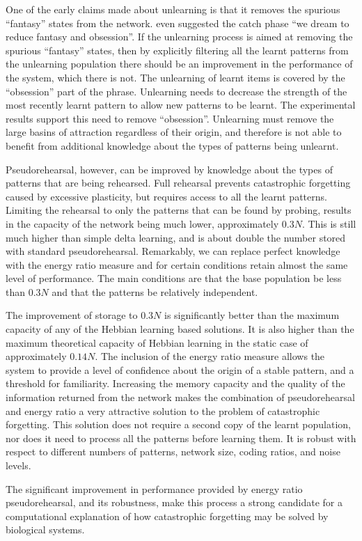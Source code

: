 One of the early claims made about unlearning is that it removes the spurious ``fantasy'' states from the network.  \citet{Crick1986} even suggested the catch phase ``we dream to reduce fantasy and obsession''.  If the unlearning process is aimed at removing the spurious ``fantasy'' states, then by explicitly filtering all the learnt patterns from the unlearning population there should be an improvement in the performance of the system, which there is not. The unlearning of learnt items is covered by the ``obsession'' part of the phrase.  Unlearning needs to decrease the strength of the most recently learnt pattern to allow new patterns to be learnt.  The experimental results support this need to remove ``obsession''.  Unlearning must remove the large basins of attraction regardless of their origin, and therefore is not able to benefit from additional knowledge about the types of patterns being unlearnt.

Pseudorehearsal, however, can be improved by knowledge about the types of patterns that are being rehearsed.  Full rehearsal prevents catastrophic forgetting caused by excessive plasticity, but requires access to all the learnt patterns.  Limiting the rehearsal to only the patterns that can be found by probing, results in the capacity of the network being much lower, approximately $0.3N$.  This is still much higher than simple delta learning, and is about double the number stored with standard pseudorehearsal.  Remarkably, we can replace perfect knowledge with the energy ratio measure and for certain conditions retain almost the same level of performance.  The main conditions are that the base population be less than $0.3N$ and that the patterns be relatively independent.

The improvement of storage to $0.3N$ is significantly better than the maximum capacity of any of the Hebbian learning based solutions.  It is also higher than the maximum theoretical capacity of Hebbian learning in the static case of approximately $0.14N$.  The inclusion of the energy ratio measure allows the system to provide a level of confidence about the origin of a stable pattern, and a threshold for familiarity.  Increasing the memory capacity and the quality of the information returned from the network makes the combination of pseudorehearsal and energy ratio a very attractive solution to the problem of catastrophic forgetting.  This solution does not require a second copy of the learnt population, nor does it need to process all the patterns before learning them.  It is robust with respect to different numbers of patterns, network size, coding ratios, and noise levels.   

The significant improvement in performance provided by energy ratio pseudorehearsal, and its robustness, make this process a strong candidate for a computational explanation of how catastrophic forgetting may be solved by biological systems.